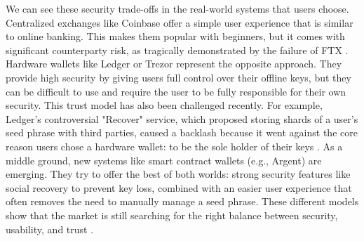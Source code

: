 We can see these security trade-offs in the real-world systems that users choose. Centralized exchanges like Coinbase offer a simple user experience that is similar to online banking. This makes them popular with beginners, but it comes with significant counterparty risk, as tragically demonstrated by the failure of FTX \cite{yu2024}. Hardware wallets like Ledger or Trezor represent the opposite approach. They provide high security by giving users full control over their offline keys, but they can be difficult to use and require the user to be fully responsible for their own security. This trust model has also been challenged recently. For example, Ledger's controversial "Recover" service, which proposed storing shards of a user's seed phrase with third parties, caused a backlash because it went against the core reason users chose a hardware wallet: to be the sole holder of their keys \cite{yu2024}. As a middle ground, new systems like smart contract wallets (e.g., Argent) are emerging. They try to offer the best of both worlds: strong security features like social recovery to prevent key loss, combined with an easier user experience that often removes the need to manually manage a seed phrase. These different models show that the market is still searching for the right balance between security, usability, and trust \cite{yu2024}.